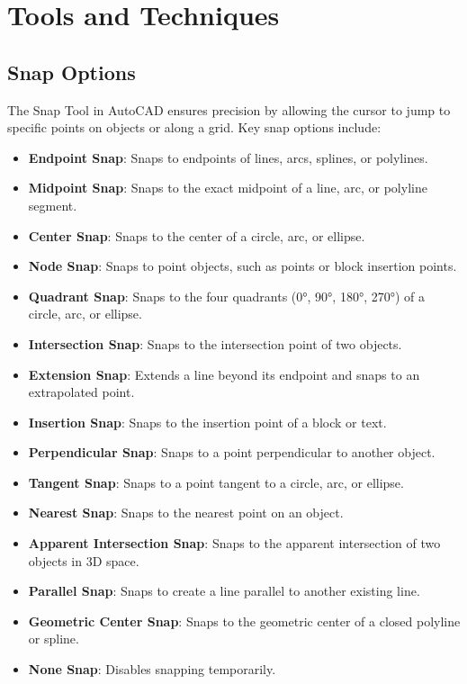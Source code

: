 \documentclass[12pt]{article}
\begin{document}
\section*{Tools and Techniques}
\subsection*{Snap Options}
The Snap Tool in AutoCAD ensures precision by allowing the cursor to jump to specific points on objects or along a grid. Key snap options include:

\begin{itemize}
    \item \textbf{Endpoint Snap}: Snaps to endpoints of lines, arcs, splines, or polylines.
    \item \textbf{Midpoint Snap}: Snaps to the exact midpoint of a line, arc, or polyline segment.
    \item \textbf{Center Snap}: Snaps to the center of a circle, arc, or ellipse.
    \item \textbf{Node Snap}: Snaps to point objects, such as points or block insertion points.
    \item \textbf{Quadrant Snap}: Snaps to the four quadrants (0°, 90°, 180°, 270°) of a circle, arc, or ellipse.
    \item \textbf{Intersection Snap}: Snaps to the intersection point of two objects.
    \item \textbf{Extension Snap}: Extends a line beyond its endpoint and snaps to an extrapolated point.
    \item \textbf{Insertion Snap}: Snaps to the insertion point of a block or text.
    \item \textbf{Perpendicular Snap}: Snaps to a point perpendicular to another object.
    \item \textbf{Tangent Snap}: Snaps to a point tangent to a circle, arc, or ellipse.
    \item \textbf{Nearest Snap}: Snaps to the nearest point on an object.
    \item \textbf{Apparent Intersection Snap}: Snaps to the apparent intersection of two objects in 3D space.
    \item \textbf{Parallel Snap}: Snaps to create a line parallel to another existing line.
    \item \textbf{Geometric Center Snap}: Snaps to the geometric center of a closed polyline or spline.
    \item \textbf{None Snap}: Disables snapping temporarily.
\end{itemize}
\end{document}
